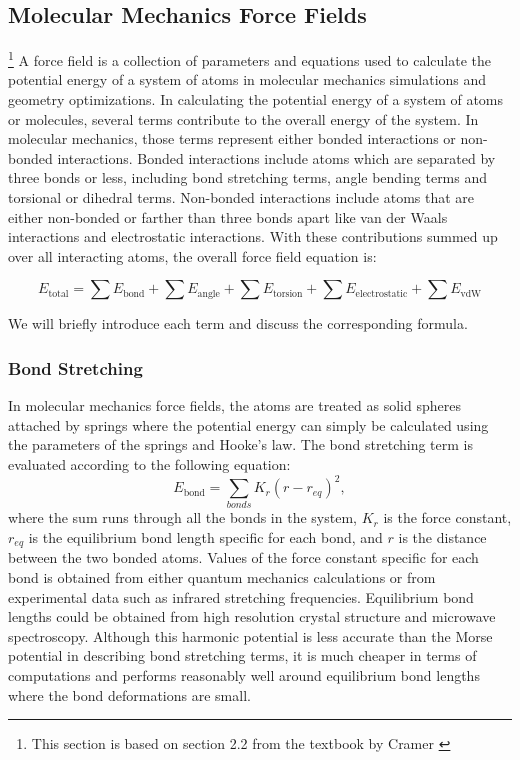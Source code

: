 \documentclass[11pt]{report}
\begin{document}
\subsection{Molecular Mechanics Force Fields}


\footnote{This section is based on section 2.2 from the textbook by Cramer
\cite{Cramer2004}} A force field is a collection of parameters and
equations used to calculate the potential energy 
of a system of atoms in molecular mechanics
simulations and geometry optimizations.
In calculating the potential energy of a system of atoms or molecules, several terms contribute
to the overall energy of the system. In molecular
mechanics, those terms represent either bonded interactions or non-bonded interactions.
Bonded interactions include atoms which are separated by three bonds or less, including bond stretching terms,
angle bending terms and torsional or dihedral
terms. Non-bonded interactions include atoms that are either non-bonded or farther than three bonds apart like van der Waals interactions and electrostatic interactions. With these contributions summed up over all 
interacting atoms, the overall force field
equation is:

\begin{equation}
\label{e:I-ff}
E_\text{total} = \sum E_\text{bond} + \sum E_\text{angle} + \sum E_\text{torsion} + \sum E_\text{electrostatic} 
+ \sum E_\text{vdW}
\end{equation}

We will briefly introduce each term and discuss
the corresponding formula.

\subsubsection{Bond Stretching}

In molecular mechanics force fields, the atoms
are treated as solid spheres attached by
springs where the potential energy can simply be calculated using the parameters of the springs
and Hooke's law. The bond stretching term 
is evaluated according to the following equation:
\begin{equation}
E_\text{bond} = \sum_{bonds} K_r
\left(r - r_{eq} \right)^2,
\end{equation}
where the sum runs through all the
bonds in the system, $K_r$ is
the force constant, $r_{eq}$ is
the equilibrium bond length
specific for each bond, and $r$ 
is the distance between the two bonded atoms. Values
of the force constant specific
for each bond is obtained from
either quantum mechanics
calculations or from experimental
data such as infrared stretching
frequencies. Equilibrium 
bond lengths could be obtained 
from high resolution 
crystal structure and microwave 
spectroscopy.
Although this harmonic potential 
is less accurate than 
the Morse potential in describing
bond stretching terms, it is 
much cheaper in terms of computations
and performs reasonably well
around equilibrium bond lengths
where the bond deformations are 
small.
\end{document}
